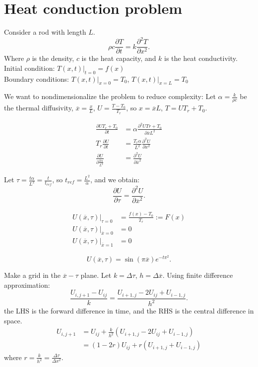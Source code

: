 \documentclass[class=article,crop=false]{standalone}
\theoremstyle{plain}
\theoremstyle{remark}
\begin{document}
\section{Heat conduction problem}
Consider a rod with length $L$.
\[
\rho c \frac{\partial T}{\partial t} =k \frac{\partial^2 T}{\partial x^2} 
.\] 
Where $\rho$ is the density,  $c$ is the heat capacity, and  $k$ is the heat conductivity.
Initial condition: $T(x,t)|_{t=0}=f(x)$\\
Boundary conditions: $T(x,t)|_{x=0}=T_0$, $T(x,t)|_{x=L}=T_0$

We want to nondimensionalize the problem to reduce complexity:
Let $\alpha=\frac{k}{\rho c}$ be the thermal diffusivity, $\overline{x}=\frac{x}{L}$, $U=\frac{T-T_0}{T_r}$, so $x=\overline{x}L$, $T=UT_r + T_0$.

\begin{align*}
	\frac{\partial UT_r + T_0}{\partial t} &= \alpha \frac{\partial^2 UTr+T_0}{\partial {\overline{x}L}^2}  \\
	T_r \frac{\partial U}{\partial t} &= \frac{T_r \alpha}{L^2} \frac{\partial^2 U}{\partial x^2}  \\
	\frac{\partial U}{\partial \frac{t \alpha}{L^2}} &= \frac{\partial^2 U}{\partial {\overline{x}}^2} 
\end{align*}

Let $\tau=\frac{t \alpha}{L^2}=\frac{t}{t_{ref}}$, so $t_{ref}=\frac{L^2}{\alpha}$, and we obtain:
\[
	\frac{\partial U}{\partial \tau} = \frac{\partial^2 U}{\partial {\overline{x}}^2} 
.\] 

\begin{align*}
	U(\overline{x},\tau)|_{\tau=0} &= \frac{f(x)-T_0}{T_r} := F(x) \\
	U(\overline{x},\tau)|_{\overline{x}=0} &= 0 \\
	U(\overline{x},\tau)|_{\overline{x}=1} &= 0
\end{align*}

\[
U(\overline{x},\tau)=\sin(\pi\overline{x}) e^{-t\pi^2}
.\]

Make a grid in the $\overline{x}-\tau$ plane.
Let $k=\Delta \tau$, $h=\Delta \overline{x}$.
Using finite difference approximation:
\[
	\frac{U_{i,j+1}-U_{ij}}{k} = \frac{U_{i+1,j}-2U_{ij} + U_{i-1,j}}{h^2}
.\] 
the LHS is the forward difference in time, and the RHS is the central difference in space.
\begin{align*}
	U_{i,j+1}&= U_{ij} +\frac{k}{h^2}(U_{i+1,j}-2U_{ij} +U_{i-1,j}) \\
		 &= (1-2r) U_{ij}  + r(U_{i+1,j}+U_{i-1,j}) 
\end{align*}
where $r=\frac{k}{h^2}=\frac{\Delta \tau}{\Delta x^2}$.
\end{document}
